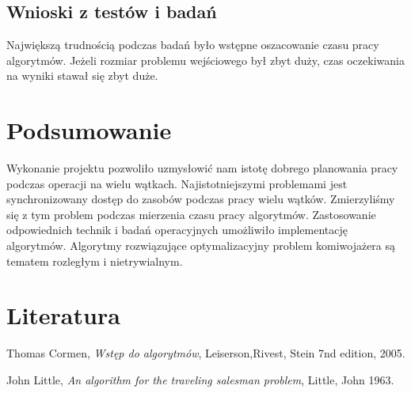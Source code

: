 \documentclass{article}
\begin{document}
	\subsection{Wnioski z testów i badań}
		Największą trudnością podczas badań było wstępne oszacowanie czasu pracy algorytmów. Jeżeli rozmiar problemu wejściowego był zbyt duży, czas oczekiwania na wyniki stawał się zbyt duże.
		
\section{Podsumowanie}
	Wykonanie projektu pozwoliło uzmysłowić nam istotę dobrego planowania pracy podczas operacji na wielu wątkach. Najistotniejszymi problemami jest synchronizowany dostęp do zasobów podczas pracy wielu wątków. Zmierzyliśmy się z tym problem podczas mierzenia czasu pracy algorytmów. Zastosowanie odpowiednich technik i badań operacyjnych umożliwiło implementację algorytmów. Algorytmy rozwiązujące optymalizacyjny problem komiwojażera są tematem rozległym i nietrywialnym.
\section{Literatura}
\printbibliography[heading=none]
\begin{thebibliography}{9}
	
	Thomas Cormen,
	\emph{Wstęp do algorytmów},
	Leiserson,Rivest, Stein
	7nd edition,
	2005.
	
	John Little, 
	\emph{An algorithm for the traveling salesman problem},
	Little, John
	1963.
	\end{thebibliography}
\end{document}
